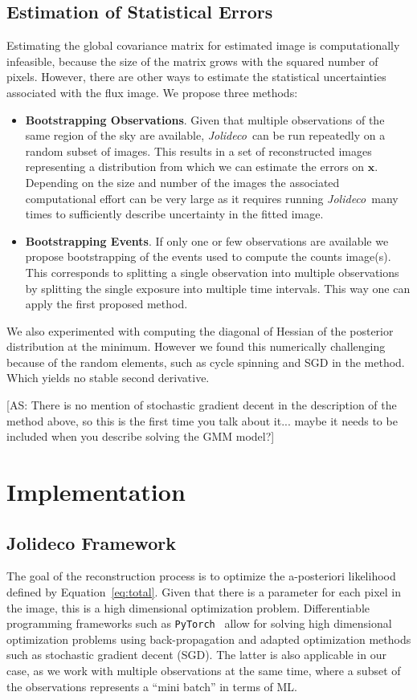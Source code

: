 \documentclass[twocolumn]{aastex631}
\newcommand{\jolideco}{\textit{Jolideco}~}
\newcommand{\as}[1]{{\color{purple} [AS: #1]}}
\begin{document}
    \subsection{Estimation of Statistical Errors}
    Estimating the global covariance matrix for estimated image is computationally infeasible, because the size of the matrix grows with the squared number of pixels. However, there are other ways to estimate the statistical uncertainties associated with the flux image. We propose three methods:

    \begin{itemize}
    \item \textbf{Bootstrapping Observations}. Given that multiple observations of the same region of the sky are available, \jolideco can be run repeatedly on a random subset of images. This results in a set of reconstructed images representing a distribution from which we can estimate the errors on $\mathbf{x}$. Depending on the size and number of the images the associated computational effort can be very large as it requires running \jolideco many times to sufficiently describe uncertainty in the fitted image.

    \item \textbf{Bootstrapping Events}. If only one or few observations are available we propose bootstrapping of the events used to compute the counts image(s). This corresponds to splitting a single observation into multiple observations by splitting the single exposure into multiple time intervals. This way one can apply the first proposed method.
    \end{itemize}

    We also experimented with computing the diagonal of Hessian of the posterior distribution at the minimum. However we found this numerically challenging because of the random elements, such as cycle spinning and SGD in the method. Which yields no stable second derivative.

\as{There is no mention of stochastic gradient decent in the description of the method above, so this is the first time you talk about it... maybe it needs to be included when you describe solving the GMM model?}

    \section{Implementation}
    \subsection{Jolideco Framework}
    The goal of the reconstruction process is to optimize the a-posteriori likelihood defined by Equation~\ref{eq:total}. Given that there is a parameter for each pixel in the image,  
    this is a high dimensional optimization problem. Differentiable programming frameworks such as \texttt{PyTorch}~\citep{Pytorch2019} allow for solving high dimensional optimization problems using back-propagation and adapted optimization methods such as stochastic gradient decent (SGD). The latter is also applicable in our case, as we work with multiple observations at the same time, where a subset of the observations represents a \enquote{mini batch} in terms of ML.
\end{document}
